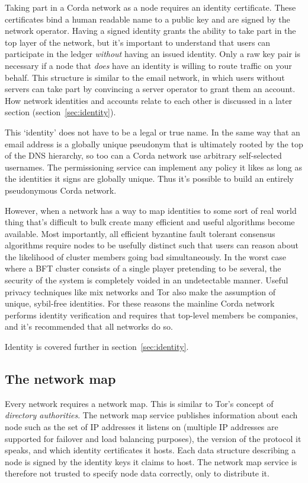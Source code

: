 \documentclass{article}
\begin{document}
Taking part in a Corda network as a node requires an identity certificate. These certificates bind a human readable
name to a public key and are signed by the network operator. Having a signed identity grants the ability to take
part in the top layer of the network, but it's important to understand that users can participate in the ledger
\emph{without} having an issued identity. Only a raw key pair is necessary if a node that \emph{does} have an
identity is willing to route traffic on your behalf. This structure is similar to the email network, in which users
without servers can take part by convincing a server operator to grant them an account. How network identities and
accounts relate to each other is discussed in a later section (section~\cref{sec:identity}).

This `identity' does not have to be a legal or true name. In the same way that an email address is a globally
unique pseudonym that is ultimately rooted by the top of the DNS hierarchy, so too can a Corda network use
arbitrary self-selected usernames. The permissioning service can implement any policy it likes as long as the
identities it signs are globally unique. Thus it's possible to build an entirely pseudonymous Corda network.

However, when a network has a way to map identities to some sort of real world thing that's difficult to bulk create
many efficient and useful algorithms become available. Most importantly, all efficient byzantine fault tolerant
consensus algorithms require nodes to be usefully distinct such that users can reason about the likelihood of cluster
members going bad simultaneously. In the worst case where a BFT cluster consists of a single player pretending to be
several, the security of the system is completely voided in an undetectable manner. Useful privacy techniques like
mix networks and Tor\cite{Dingledine:2004:TSO:1251375.1251396} also make the assumption of unique, sybil-free
identities. For these reasons the mainline Corda network performs identity verification and requires that
top-level members be companies, and it's recommended that all networks do so.

Identity is covered further in section~\cref{sec:identity}.

\subsection{The network map}

Every network requires a network map. This is similar to Tor's concept of \emph{directory authorities}. The network
map service publishes information about each node such as the set of IP addresses it listens on (multiple IP
addresses are supported for failover and load balancing purposes), the version of the protocol it speaks, and which
identity certificates it hosts. Each data structure describing a node is signed by the identity keys it claims to
host. The network map service is therefore not trusted to specify node data correctly, only to distribute it.
\end{document}
